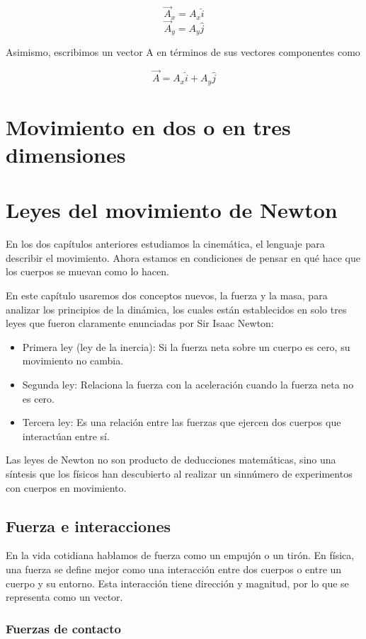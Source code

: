 \documentclass{article}
\newcommand{\newsection}[1]{
    \vspace{0.5cm}
    {\color{sectionColor}
    \centering
    \section{\bl{#1}}}
    \color{black}
    \vspace{0.5cm}
}
\newcommand{\newsubsection}[1]{
    \vspace{0.5cm}
    \color{sectionColor}
    \subsection{ #1}
    \color{black}
    \vspace{0.5cm}
}
\newcommand{\newtitle}[1]{
    \color{titleColor}
    \subsubsection{\textbf{#1}}
    \color{black}
}
\newcommand{\bl}[1]{\textbf{#1}}
\begin{document}
    \[ \vec{A}_x = A_x \hat{i} \]
    \[ \vec{A}_y = A_y \hat{j} \]

    Asimismo, escribimos un vector A en términos de sus vectores componentes como

    \[ \vec{A} = A_x \hat{i} + A_y \hat{j} \]

\newsection{Movimiento en dos o en tres dimensiones}


\newsection{Leyes del movimiento de Newton}

\par En los dos capítulos anteriores estudiamos la cinemática, el lenguaje para describir el movimiento. Ahora estamos en condiciones de pensar en qué hace que los cuerpos se muevan como lo hacen.

\par En este capítulo usaremos dos conceptos nuevos, la fuerza y la masa, para analizar los principios de la dinámica, los cuales están establecidos en solo tres leyes que fueron claramente enunciadas por Sir Isaac Newton:

\begin{itemize}
    \item Primera ley (ley de la inercia): Si la fuerza neta sobre un cuerpo es cero, su movimiento no cambia.
    \item Segunda ley: Relaciona la fuerza con la aceleración cuando la fuerza neta no es cero.
    \item Tercera ley: Es una relación entre las fuerzas que ejercen dos cuerpos que interactúan entre sí.
\end{itemize}

\par Las leyes de Newton no son producto de deducciones matemáticas, sino una síntesis que los físicos han descubierto al realizar un sinnúmero de experimentos con cuerpos en movimiento.


    \newsubsection{Fuerza e interacciones}

        \par En la vida cotidiana hablamos de fuerza como un empujón o un tirón. En física, una fuerza se define mejor como una interacción entre dos cuerpos o entre un cuerpo y su entorno. Esta interacción tiene dirección y magnitud, por lo que se representa como un vector.

    \newtitle{Fuerzas de contacto}
\end{document}
